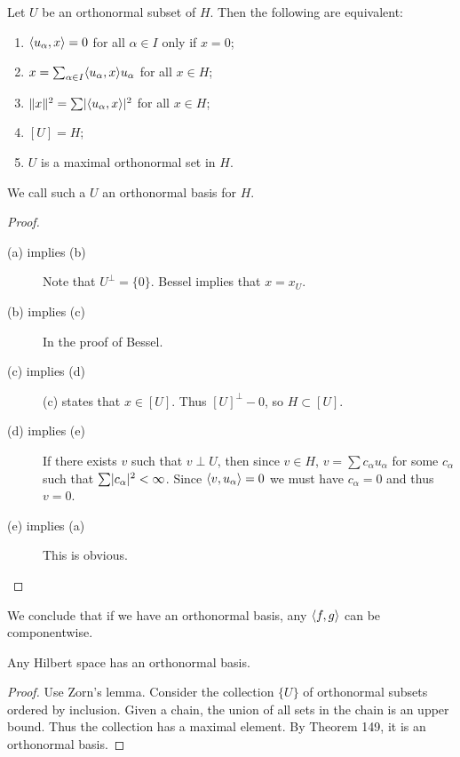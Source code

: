 \documentclass[10pt, twoside]{article}
\begin{document}
    \begin{thm}
        Let $U$ be an orthonormal subset of $H$. Then the following are equivalent:
        \begin{enumerate}[label=(\alph*)]
            \item $\langle u_{\alpha},x\rangle = 0$ for all $\alpha \in I$ only if $x=0$;
            \item $x = \sum_{\alpha \in I} \langle u_{\alpha},x\rangle u_{\alpha}$ for all $x \in H$;
            \item $\lVert x\rVert^2 = \sum \lvert\langle u_{\alpha},x\rangle\rvert^2$ for all $x \in H$;
            \item $[U] = H$;
            \item $U$ is a maximal orthonormal set in $H$.
        \end{enumerate}
        We call such a $U$ an orthonormal basis for $H$.
        \begin{proof}
            \begin{description}
                \item[(a) implies (b)] Note that $U^{\perp} = \{0\}$. Bessel implies that $x=x_U$.
                \item[(b) implies (c)] In the proof of Bessel.
                \item[(c) implies (d)] (c) states that $x \in [U]$. Thus $[U]^{\perp} - 0$, so $H \subset [U]$.
                \item[(d) implies (e)] If there exists $v$ such that $v \perp U$, then since $v \in H$, $v= \sum c_{\alpha} u_{\alpha}$ for some $c_{\alpha}$ such that $\sum \lvert c_{\alpha}\rvert^2 < \infty$. Since $\langle v,u_{\alpha}\rangle = 0$ we must have $c_{\alpha} = 0$ and thus $v=0$.
                \item[(e) implies (a)] This is obvious.
            \end{description}
        \end{proof}
    \end{thm}

    We conclude that if we have an orthonormal basis, any $\langle f,g\rangle$ can be componentwise.

    \begin{thm}
        Any Hilbert space has an orthonormal basis.
        \begin{proof}
            Use Zorn's lemma. Consider the collection $\{U\}$ of orthonormal subsets ordered by inclusion. Given a chain, the union of all sets in the chain is an upper bound. Thus the collection has a maximal element. By Theorem 149, it is an orthonormal basis.
        \end{proof}
    \end{thm}
\end{document}
